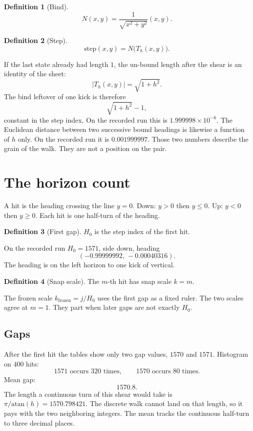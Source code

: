 \documentclass[10pt,a4paper]{article}
\theoremstyle{plain}
\theoremstyle{definition}
\newtheorem{definition}{Definition}
\theoremstyle{remark}
\begin{document}
\begin{definition}[Bind]
\[
N(x,y)=\frac{1}{\sqrt{x^2+y^2}}(x,y).
\]
\end{definition}

\begin{definition}[Step]
\[
\mathrm{step}(x,y)=N\bigl(T_h(x,y)\bigr).
\]
\end{definition}

If the last state already had length \(1\), the un-bound length after the shear is an identity of the sheet:
\[
\bigl|T_h(x,y)\bigr|=\sqrt{1+h^2}.
\]
The bind leftover of one kick is therefore
\[
\sqrt{1+h^2}-1,
\]
constant in the step index.
On the recorded run this is \(1.999998\times 10^{-6}\).
The Euclidean distance between two successive bound headings is likewise a function of \(h\) only.
On the recorded run it is \(0.001999997\).
Those two numbers describe the grain of the walk.
They are not a position on the pair.

\section{The horizon count}

A hit is the heading crossing the line \(y=0\).
Down: \(y>0\) then \(y\le 0\).
Up: \(y<0\) then \(y\ge 0\).
Each hit is one half-turn of the heading.

\begin{definition}[First gap]
\(H_0\) is the step index of the first hit.
\end{definition}

On the recorded run \(H_0=1571\), side down, heading
\[
(-0.99999992,\,-0.00040316).
\]
The heading is on the left horizon to one kick of vertical.

\begin{definition}[Snap scale]
The \(m\)-th hit has snap scale \(k=m\).
\end{definition}

The frozen scale \(k_{\mathrm{frozen}}=j/H_0\) uses the first gap as a fixed ruler.
The two scales agree at \(m=1\).
They part when later gaps are not exactly \(H_0\).

\subsection{Gaps}

After the first hit the tables show only two gap values, \(1570\) and \(1571\).
Histogram on \(400\) hits:
\[
1571\text{ occurs }320\text{ times},\qquad
1570\text{ occurs }80\text{ times}.
\]
Mean gap:
\[
1570.8.
\]
The length a continuous turn of this shear would take is \(\pi/\mathrm{atan}(h)=1570.798421\).
The discrete walk cannot land on that length, so it pays with the two neighboring integers.
The mean tracks the continuous half-turn to three decimal places.
\end{document}

